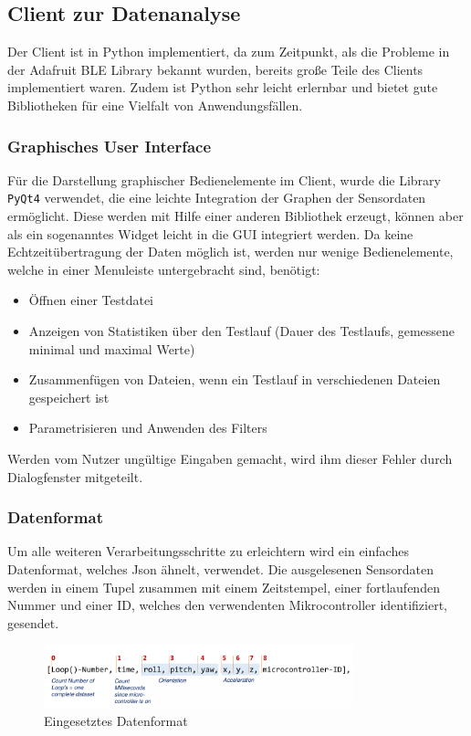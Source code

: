 \subsection{Client zur Datenanalyse}
Der Client ist in Python implementiert, da zum Zeitpunkt, als die Probleme in der Adafruit BLE Library bekannt wurden, bereits große Teile des Clients implementiert waren. Zudem ist Python sehr leicht erlernbar und bietet gute Bibliotheken für eine Vielfalt von Anwendungsfällen.
\subsubsection{Graphisches User Interface}
Für die Darstellung graphischer Bedienelemente im Client, wurde die Library \texttt{PyQt4} verwendet, die eine leichte Integration der Graphen der Sensordaten ermöglicht. Diese werden mit Hilfe einer anderen Bibliothek erzeugt, können aber als ein sogenanntes Widget leicht in die GUI integriert werden.
Da keine Echtzeitübertragung der Daten möglich ist, werden nur wenige Bedienelemente, welche in einer Menuleiste untergebracht sind, benötigt:
\begin{itemize}
\item Öffnen einer Testdatei
\item Anzeigen von Statistiken über den Testlauf (Dauer des Testlaufs, gemessene minimal und maximal Werte)
\item Zusammenfügen von Dateien, wenn ein Testlauf in verschiedenen Dateien gespeichert ist
\item Parametrisieren und Anwenden des Filters
\end{itemize}
Werden vom Nutzer ungültige Eingaben gemacht, wird ihm dieser Fehler durch Dialogfenster mitgeteilt. 
\subsubsection{Datenformat}
Um alle weiteren Verarbeitungsschritte zu erleichtern wird ein einfaches Datenformat, welches Json ähnelt, verwendet. Die ausgelesenen Sensordaten werden in einem Tupel zusammen mit einem Zeitstempel, einer fortlaufenden Nummer und einer ID, welches den verwendenten Mikrocontroller identifiziert, gesendet.
\begin{figure}[h]
	\centering
	\includegraphics[width=0.8\textwidth]{images/k3-datenformat.png}
	\caption {Eingesetztes Datenformat}
	\label{fig:k3-datenformat.png} 
\end{figure}
